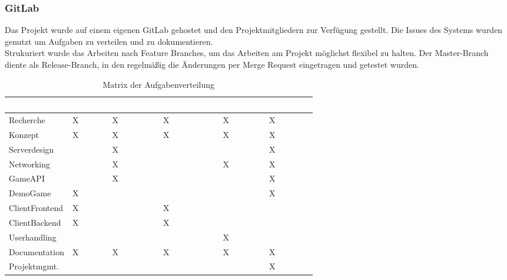 \documentclass[a4paper]{spie}  %
\begin{document}
\subsubsection{GitLab}
Das Projekt wurde auf einem eigenen GitLab gehostet und den Projektmitgliedern zur Verfügung gestellt. Die Issues des Systems wurden genutzt um Aufgaben zu verteilen und zu dokumentieren.
\\
Strukuriert wurde das Arbeiten nach Feature Branches, um das Arbeiten am Projekt möglichst flexibel zu halten. Der Master-Branch diente als Release-Branch, in den regelmäßig die Änderungen per Merge Request eingetragen und getestet wurden.
\begin{table}
	\label{table:Aufgabenverteilung}
	\centering
		\caption{Matrix der Aufgabenverteilung}
		\begin{tabular}{| L{2.6cm} | C{2cm} | C{2cm} | C{2cm} | C{2cm} | C{2cm} |}
		\hline
		\textcolor{white}{\textbf{Aufgabe}} & \textcolor{white}{\textbf{Schleiss}} & \textcolor{white}{\textbf{Grothkopf}} & \textcolor{white}{\textbf{Schiwkowski}} & \textcolor{white}{\textbf{Hofmann}} & \textcolor{white}{\textbf{Heinrichs}}\\\hline
		Recherche 		& X & X	& X	& X	& X	\\\hline
		Konzept 		& X & X	& X	& X	& X	\\\hline
		Serverdesign	& 	& X & 	& 	& X \\\hline
		Networking		& 	& X	& 	& X	& X	\\\hline
		GameAPI 		& 	& X	&	&	& X	\\\hline
		DemoGame 		& X	&	&	&	& X	\\\hline
		ClientFrontend 	& X	&	& X	&	&	\\\hline
		ClientBackend 	& X	&	& X	&	&	\\\hline
		Userhandling 	& 	&	&	& X	& 	\\\hline
		Documentation   & X	& X & X	& X	& X \\\hline
		Projektmgmt. 	&	&	&	& 	& X	\\\hline
	\end{tabular}
\end{table}
\end{document}
